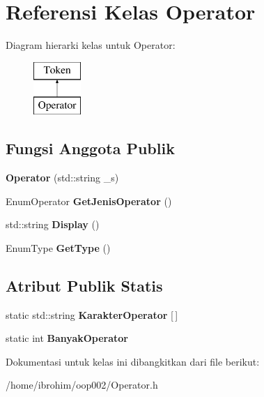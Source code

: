 \hypertarget{classOperator}{}\section{Referensi Kelas Operator}
\label{classOperator}
Diagram hierarki kelas untuk Operator\+:\begin{figure}[H]
\begin{center}
\leavevmode
\includegraphics[height=2.000000cm]{d4/dad/classOperator}
\end{center}
\end{figure}
\subsection*{Fungsi Anggota Publik}
\begin{DoxyCompactItemize}
\item 
\hypertarget{classOperator_a2199e61dda5314db8401081f2178d9a9}{}{\bfseries Operator} (std\+::string \+\_\+s)\label{classOperator_a2199e61dda5314db8401081f2178d9a9}

\item 
\hypertarget{classOperator_af0113b1134d9e54abd2a05ea69c63238}{}Enum\+Operator {\bfseries Get\+Jenis\+Operator} ()\label{classOperator_af0113b1134d9e54abd2a05ea69c63238}

\item 
\hypertarget{classOperator_a97faadd3b0c23c108eba25c409b0003d}{}std\+::string {\bfseries Display} ()\label{classOperator_a97faadd3b0c23c108eba25c409b0003d}

\item 
\hypertarget{classOperator_a52745643d188234ebac14062af0fb69c}{}Enum\+Type {\bfseries Get\+Type} ()\label{classOperator_a52745643d188234ebac14062af0fb69c}

\end{DoxyCompactItemize}
\subsection*{Atribut Publik Statis}
\begin{DoxyCompactItemize}
\item 
\hypertarget{classOperator_a932146b92cb0b726be4ec8674af116f4}{}static std\+::string {\bfseries Karakter\+Operator} \mbox{[}$\,$\mbox{]}\label{classOperator_a932146b92cb0b726be4ec8674af116f4}

\item 
\hypertarget{classOperator_a8064c68677326d96415034012d90ba7d}{}static int {\bfseries Banyak\+Operator}\label{classOperator_a8064c68677326d96415034012d90ba7d}

\end{DoxyCompactItemize}


Dokumentasi untuk kelas ini dibangkitkan dari file berikut\+:\begin{DoxyCompactItemize}
\item 
/home/ibrohim/oop002/Operator.\+h\end{DoxyCompactItemize}
